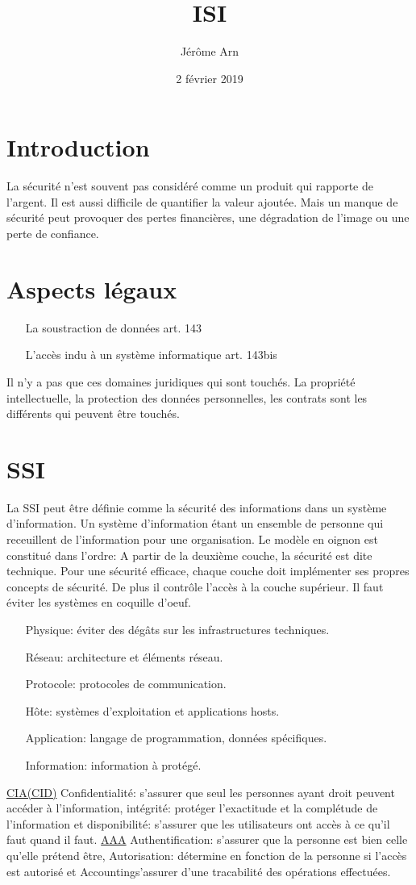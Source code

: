 \documentclass{article}
\title{ISI}
\author{Jérôme Arn}
\date{2 février 2019}
\begin{document}
\section{Introduction}
La sécurité n'est souvent pas considéré comme un produit qui rapporte de l'argent. Il est aussi difficile de quantifier la valeur ajoutée. Mais un manque de sécurité peut provoquer des pertes financières, une dégradation de l'image ou une perte de confiance. 

\section{Aspects légaux}
\bigskip
\begin{itemize}
	\item[La soustraction de données art. 143]
	\item[L'accès indu à un système informatique art. 143bis]
\end{itemize}
\bigskip
Il n'y a pas que ces domaines juridiques qui sont touchés. La propriété intellectuelle, la protection des données personnelles, les contrats sont les différents qui peuvent être touchés.
\section{SSI}
La SSI peut être définie comme la sécurité des informations dans un système d'information. Un système d'information étant un ensemble de personne qui receuillent de l'information pour une organisation. 
Le modèle en oignon est constitué dans l'ordre:
A partir de la deuxième couche, la sécurité est dite technique. Pour une sécurité efficace, chaque couche doit implémenter ses propres concepts de sécurité. De plus il contrôle l'accès à la couche supérieur. Il faut éviter les systèmes en coquille d'oeuf.
\bigskip
\begin{itemize}
	\item[Physique:]éviter des dégâts sur les infrastructures techniques.
	\item[Réseau:]architecture et éléments réseau.
	\item[Protocole:]protocoles de communication.
	\item[Hôte:]systèmes d'exploitation et applications hosts.
	\item[Application:]langage de programmation, données spécifiques. 
	\item[Information:]information à protégé.
\end{itemize}
\bigskip

\newline \uline{CIA(CID)} Confidentialité: s'assurer que seul les personnes ayant droit peuvent accéder à l'information, intégrité: protéger l'exactitude et la complétude de l'information et disponibilité: s'assurer que les utilisateurs ont accès à ce qu'il faut quand il faut. 
\newline \uline{AAA} Authentification: s'assurer que la personne est bien celle qu'elle prétend être, Autorisation: détermine en fonction de la personne si l'accès est autorisé et Accountings'assurer d'une tracabilité des opérations effectuées. 
\end{document}
